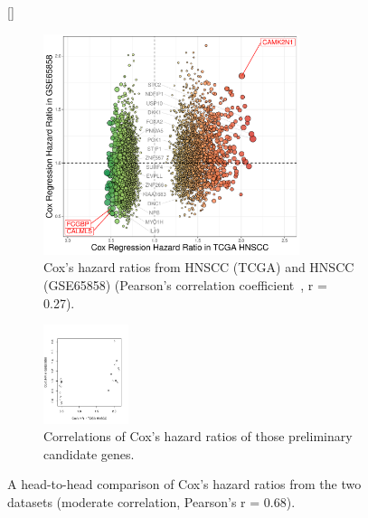 \documentclass[
paper=landscape,
paper=160mm:90mm, %
fontsize=11pt, %
pagesize, %
parskip=half-, %
]{scrartcl} %
\theoremstyle{mythmstyle} %
\begin{document}
\begin{figure}[ht]

[\FBwidth]
{%
    
    \begin{subfigure}[c]{0.5\textwidth}
    \includegraphics[width=7.5cm]{RplotH2H_TCGA_GSE65858_CoxHR.pdf}
    \caption{Cox's hazard ratios from HNSCC (TCGA) and HNSCC (GSE65858) (Pearson's correlation coefficient~\cite{Schober2018}, r = 0.27).}
    \end{subfigure}
    \begin{subfigure}[t]{0.15\textwidth}
    \includegraphics[width=2.5cm]{Rplot20_correlation_TCGA_GSE65858_CoxHR.pdf}
    \caption{Correlations of Cox's hazard ratios of those preliminary candidate genes.}%
    \end{subfigure}    
}   
{\captionsetup{labelformat=empty}    
\caption{A head-to-head comparison of Cox's hazard ratios from the two datasets (moderate correlation, Pearson's r = 0.68).
}}
\end{figure}
\end{document}

